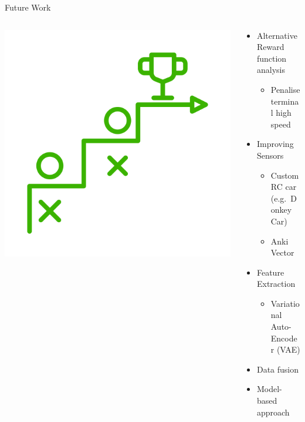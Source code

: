 \documentclass[aspectratio=169]{beamer}
\begin{document}
\begin{frame}{Future Work}
	\begin{columns}
		\begin{column}{0.4\linewidth}
			\centering
			\includegraphics[width=0.6\linewidth]{img/future.png}
		\end{column}
		\begin{column}{0.6\linewidth}
			\begin{itemize}[<+- | alert@+>]
				\item Alternative Reward function analysis
				      \begin{itemize}
					      \item Penalise terminal high speed
				      \end{itemize}
				\item Improving Sensors
				      \begin{itemize}
					      \item Custom RC car (e.g.\ Donkey Car)
					      \item Anki Vector
				      \end{itemize}
				\item Feature Extraction
				      \begin{itemize}
					      \item Variational Auto-Encoder (VAE)
				      \end{itemize}
				\item Data fusion
				\item Model-based approach
			\end{itemize}
		\end{column}
	\end{columns}
\end{frame}
\end{document}
